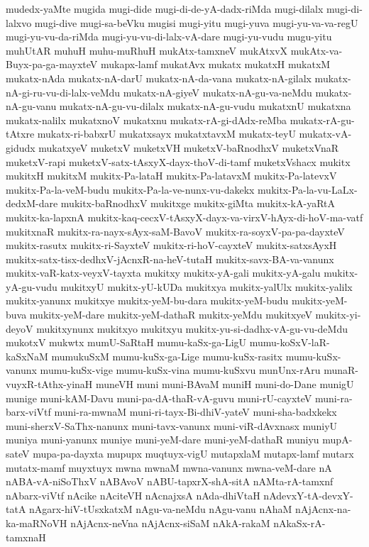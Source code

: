 {mudedx-yaMte
mugida
mugi-dide
mugi-di-de-yA-dadx-riMda
mugi-dilalx
mugi-di-lalxvo
mugi-dive
mugi-sa-beVku
mugisi
mugi-yitu
mugi-yuva
mugi-yu-va-va-regU
mugi-yu-vu-da-riMda
mugi-yu-vu-di-lalx-vA-dare
mugi-yu-vudu
mugu-yitu
muhUtAR
muhuH
muhu-muRhuH
mukAtx-tamxneV
mukAtxvX
mukAtx-va-Buyx-pa-ga-mayxteV
mukapx-lamf
mukatAvx
mukatx
mukatxH
mukatxM
mukatx-nAda
mukatx-nA-darU
mukatx-nA-da-vana
mukatx-nA-gilalx
mukatx-nA-gi-ru-vu-di-lalx-veMdu
mukatx-nA-giyeV
mukatx-nA-gu-va-neMdu
mukatx-nA-gu-vanu
mukatx-nA-gu-vu-dilalx
mukatx-nA-gu-vudu
mukatxnU
mukatxna
mukatx-nalilx
mukatxnoV
mukatxnu
mukatx-rA-gi-dAdx-reMba
mukatx-rA-gu-tAtxre
mukatx-ri-babxrU
mukatxsayx
mukatxtavxM
mukatx-teyU
mukatx-vA-gidudx
mukatxyeV
muketxV
muketxVH
muketxV-baRnodhxV
muketxVnaR
muketxV-rapi
muketxV-satx-tAsxyX-dayx-thoV-di-tamf
muketxVshacx
mukitx
mukitxH
mukitxM
mukitx-Pa-lataH
mukitx-Pa-latavxM
mukitx-Pa-latevxV
mukitx-Pa-la-veM-budu
mukitx-Pa-la-ve-nunx-vu-dakekx
mukitx-Pa-la-vu-LaLx-dedxM-dare
mukitx-baRnodhxV
mukitxge
mukitx-giMta
mukitx-kA-yaRtA
mukitx-ka-lapxnA
mukitx-kaq-cecxV-tAsxyX-dayx-va-virxV-hAyx-di-hoV-ma-vatf
mukitxnaR
mukitx-ra-nayx-sAyx-saM-BavoV
mukitx-ra-soyxV-pa-pa-dayxteV
mukitx-rasutx
mukitx-ri-SayxteV
mukitx-ri-hoV-cayxteV
mukitx-satxsAyxH
mukitx-satx-tisx-dedhxV-jAcnxR-na-heV-tutaH
mukitx-savx-BA-va-vanunx
mukitx-vaR-katx-veyxV-tayxta
mukitxy
mukitx-yA-gali
mukitx-yA-galu
mukitx-yA-gu-vudu
mukitxyU
mukitx-yU-kUDa
mukitxya
mukitx-yalUlx
mukitx-yalilx
mukitx-yanunx
mukitxye
mukitx-yeM-bu-dara
mukitx-yeM-budu
mukitx-yeM-buva
mukitx-yeM-dare
mukitx-yeM-dathaR
mukitx-yeMdu
mukitxyeV
mukitx-yi-deyoV
mukitxynunx
mukitxyo
mukitxyu
mukitx-yu-si-dadhx-vA-gu-vu-deMdu
mukotxV
mukwtx
mumU-SaRtaH
mumu-kaSx-ga-LigU
mumu-koSxV-laR-kaSxNaM
mumukuSxM
mumu-kuSx-ga-Lige
mumu-kuSx-rasitx
mumu-kuSx-vanunx
mumu-kuSx-vige
mumu-kuSx-vina
mumu-kuSxvu
munUnx-rAru
munaR-vuyxR-tAthx-yinaH
muneVH
muni
muni-BAvaM
muniH
muni-do-Dane
munigU
munige
muni-kAM-Davu
muni-pa-dA-thaR-vA-guvu
muni-rU-cayxteV
muni-ra-barx-viVtf
muni-ra-mwnaM
muni-ri-tayx-Bi-dhiV-yateV
muni-sha-badxkekx
muni-sherxV-SaThx-nanunx
muni-tavx-vanunx
muni-viR-dAvxnasx
muniyU
muniya
muni-yanunx
muniye
muni-yeM-dare
muni-yeM-dathaR
muniyu
mupA-sateV
mupa-pa-dayxta
mupupx
muqtuyx-vigU
mutapxlaM
mutapx-lamf
mutarx
mutatx-mamf
muyxtuyx
mwna
mwnaM
mwna-vanunx
mwna-veM-dare
nA
nABA-vA-niSoThxV
nABAvoV
nABU-tapxrX-shA-sitA
nAMta-rA-tamxnf
nAbarx-viVtf
nAcike
nAciteVH
nAcnajxsA
nAda-dhiVtaH
nAdevxY-tA-devxY-tatA
nAgarx-hiV-tUsxkatxM
nAgu-va-neMdu
nAgu-vanu
nAhaM
nAjAcnx-na-ka-maRNoVH
nAjAcnx-neVna
nAjAcnx-siSaM
nAkA-rakaM
nAkaSx-rA-tamxnaH
}
